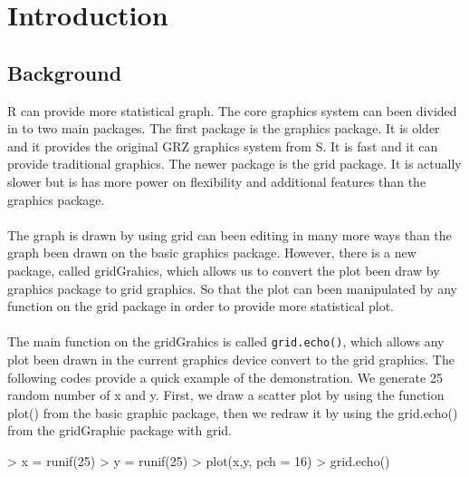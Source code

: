 \documentclass[a4paper,10pt]{article}
\begin{document}


\section{Introduction}
\subsection{Background}
R can provide more statistical graph. The core graphics system can been divided in to two main packages. The first package is the graphics package. It is older and it provides the original GRZ graphics system from S. It is fast and it can provide traditional graphics. The newer package is the grid package. It is actually slower but is has more power on flexibility and additional features than the graphics package. \\\\
The graph is drawn by using grid can been editing in many more ways than the graph been drawn on the basic graphics package. However, there is a new package, called gridGrahics, which allows us to convert the plot been draw by graphics package to grid graphics. So that the plot can been manipulated by any function on the grid package in order to provide more statistical plot. \\\\
The main function on the gridGrahics is called \texttt{grid.echo()}, which allows any plot been drawn in the current graphics device convert to the grid graphics. The following codes provide a quick example of the demonstration. We generate 25 random number of x and y. First, we draw a scatter plot by using the function plot() from the basic graphic package, then we redraw it by using the grid.echo() from the gridGraphic package with grid.
\begin{Schunk}
\begin{Sinput}
> x = runif(25)
> y = runif(25)
> plot(x,y, pch = 16)
> grid.echo()
\end{Sinput}
\end{Schunk}
\end{document}
